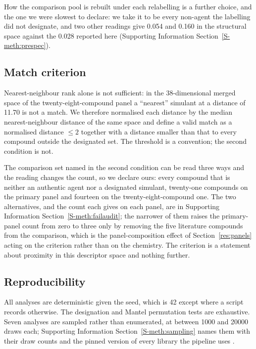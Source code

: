 \documentclass[journal=ancham,manuscript=article,margin=1in]{achemso}
\begin{document}
How the comparison pool is rebuilt under each relabelling is a further choice,
and the one we were slowest to declare: we take it to be every non-agent the
labelling did not designate, and two other readings give 0.054 and 0.160 in the
structural space against the 0.028 reported here (Supporting Information
Section~\ref{S-meth:prespec}).

\subsection{Match criterion}
\label{meth:match}
Nearest-neighbour rank alone is not sufficient: in the 38-dimensional merged
space of the twenty-eight-compound panel a ``nearest'' simulant at a distance of
11.70 is not a match. We therefore normalised each distance by the median
nearest-neighbour distance of the same space and define a valid match as a
normalised distance $\le 2$ together with a distance smaller than that to every
compound outside the designated set. The threshold is a convention; the second
condition is not.

The comparison set named in the second condition can be read three ways and the
reading changes the count, so we declare ours: every compound that is neither an
authentic agent nor a designated simulant, twenty-one compounds on the primary
panel and fourteen on the twenty-eight-compound one. The two alternatives, and
the count each gives on each panel, are in Supporting Information
Section~\ref{S-meth:failaudit}; the narrower of them raises the primary-panel
count from zero to three only by removing the five literature compounds from the
comparison, which is the panel-composition effect of Section~\ref{res:panels}
acting on the criterion rather than on the chemistry. The criterion is a
statement about proximity in this descriptor space and nothing further.

\subsection{Reproducibility}
\label{res:repro}
All analyses are deterministic given the seed, which is 42 except where a
script records otherwise. The designation and Mantel permutation tests are
exhaustive. Seven analyses are sampled rather than enumerated, at between 1000
and 20000 draws each; Supporting Information
Section~\ref{S-meth:sampling} names them with their draw counts and the pinned
version of every library the pipeline uses
\cite{numpy2020,scipy2020,mckinney2010,matplotlib2007,rdkit,pyscf2020}.
\end{document}
